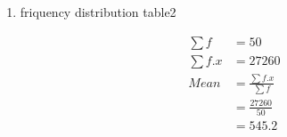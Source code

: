 \renewcommand{\theequation}{\theenumi}
\begin{enumerate}[label=\arabic*.,ref=\thesubsection.\theenumi]
\item \begin{table}[!ht]
	\centering
	
	\caption{friquency distribution table2 }
\end{table}
\begin{align}
\sum{f} &= 50
\\
\sum{f.x} &= 27260
\\
Mean &= \frac{\sum{f.x}}{\sum{f}}
\\&= \frac{27260}{50}
\\&= 545.2
\end{align}
\end{enumerate}